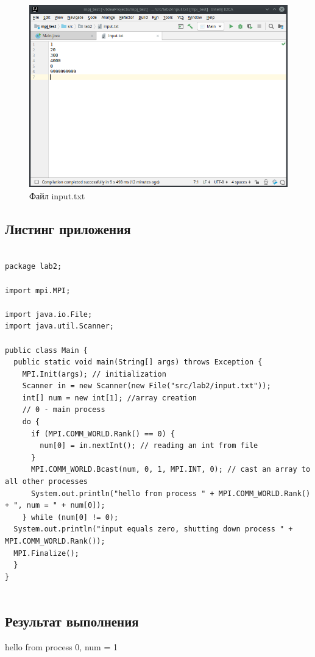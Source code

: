 \documentclass[titlepage,oneside,final,14pt]{extarticle} %
\begin{document}
\begin{figure}[H]
	\includegraphics[width=1\linewidth]{input_txt}
	\centering
	\caption{Файл input.txt}
\end{figure}

\subsection{Листинг приложения}

\begin{lstlisting}

package lab2;

import mpi.MPI;

import java.io.File;
import java.util.Scanner;

public class Main {
  public static void main(String[] args) throws Exception {
    MPI.Init(args); // initialization
    Scanner in = new Scanner(new File("src/lab2/input.txt"));
    int[] num = new int[1]; //array creation
    // 0 - main process
    do {
      if (MPI.COMM_WORLD.Rank() == 0) {
        num[0] = in.nextInt(); // reading an int from file
      }
      MPI.COMM_WORLD.Bcast(num, 0, 1, MPI.INT, 0); // cast an array to all other processes
      System.out.println("hello from process " + MPI.COMM_WORLD.Rank() + ", num = " + num[0]);
    } while (num[0] != 0);
  System.out.println("input equals zero, shutting down process " + MPI.COMM_WORLD.Rank());
  MPI.Finalize();
  }
}


\end{lstlisting}

\subsection{Результат выполнения}
\ttfamily
hello from process 0, num = 1
\end{document}
